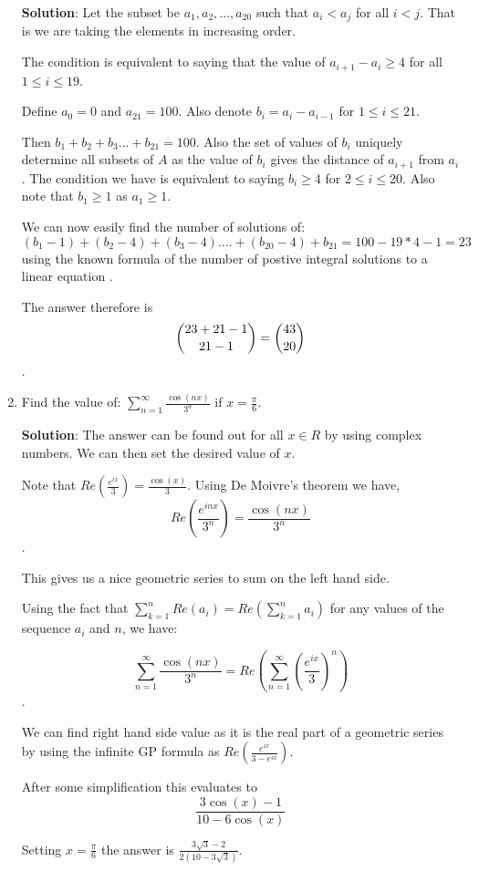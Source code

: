 \documentclass[a4paper]{article}
\begin{document}
\begin{enumerate}
\textbf{Solution}: Let the subset be ${a_1, a_2, ..., a_{20}}$ such that $a_i < a_j $ for all $ i < j $. That is we are taking the elements in increasing order.

The condition is equivalent to saying that the value of $a_{i+1} - a_i  \geq 4$ for all $ 1 \leq i \leq 19$.

Define $a_0 = 0$ and $a_{21} = 100$. Also denote $b_i = a_i - a_{i-1}$ for $ 1 \leq i \leq 21$.

Then $b_1 + b_2 + b_3 ... + b_{21} = 100$. Also the set of values of $b_i$ uniquely determine all subsets of $A$ as the value of $b_i$ gives the distance of $a_{i+1}$ from $a_i$. The condition we have is equivalent to saying $b_i \geq 4$ for $2 \leq i \leq 20$. Also note that $b_1 \geq 1$ as $a_1 \geq 1$.

We can now easily find the number of solutions of:
$(b_1 -  1)+ (b_2 - 4) + (b_3 - 4) .... + (b_{20} - 4) + b_{21} = 100 - 19*4 - 1 = 23$ using the known formula of the number of postive integral solutions to a linear equation .

The answer therefore is $$\dbinom{23 + 21 - 1}{21 - 1} = \dbinom{43}{20}$$.

\item Find the value of:
$ \displaystyle \sum_{n=1}^{\infty}\frac{\cos(nx)} {3^n} $ if $x = \frac{\pi}{6}$.

\textbf{Solution}: The answer can be found out for all $x \in R$ by using complex numbers. We can then set the desired value of $x$.

Note that $ Re(\frac{e^{ix}}{3}) = \frac{\cos(x)}{3}$. Using De Moivre's theorem we have, $$ Re(\frac{e^{inx}}{3^n}) = \frac{\cos(nx)}{3^n}$$. 

This gives us a nice geometric series to sum on the left hand side.

Using the fact that $ \sum_{k=1}^{n} Re(a_i) = Re(\sum_{k=1}^{n} a_i)$ for any values of the sequence $a_i$ and $n$, we have:

$$ \sum_{n=1}^{\infty} \frac{\cos(nx)}{3^n} = Re( \sum_{n=1}^{\infty}  (\frac{e^{ix}}{3})^n ) $$.

We can find right hand side value as it is the real part of a  geometric series by using the infinite GP formula as $Re(\frac{e^{ix}}{3 - e^{ix}})$.

After some simplification this evaluates to $$\displaystyle \frac{3\cos(x) - 1}{10 - 6\cos(x)}$$

Setting $\displaystyle x = \frac{\pi}{6}$ the answer is $\displaystyle \frac{3\sqrt{3}-2}{2(10 - 3\sqrt{3})}$.


\end{enumerate}
\end{document}
